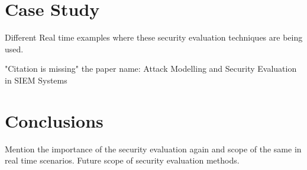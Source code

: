 \documentclass[pdftex,english,oribibl]{llncs}
\begin{document}
\section{Case Study}
Different Real time examples where these security evaluation techniques are being used.\newline

	\cite{Kotenko}\newline
	"Citation is missing" the paper name: Attack Modelling and Security Evaluation in SIEM Systems\newline
	
\section{Conclusions}\label{sec:conclusions}
Mention the importance of the security evaluation again and scope of the same in real time scenarios.
Future scope of security evaluation methods.


\end{document}

